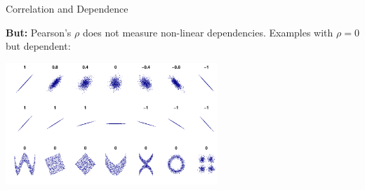 \documentclass[11pt,compress,t,notes=noshow, aspectratio=169, xcolor=table]{beamer}
\begin{document}
\begin{frame}{Correlation and Dependence}

\textbf{But:} Pearson's $\rho$ does not measure non-linear dependencies. Examples with $\rho = 0$ but dependent:

\centering
\includegraphics[width = 0.6\textwidth, trim=0 0 0 190px, clip]{figure/dependence_2}
\end{frame}
\end{document}
